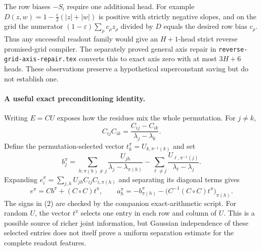 \documentclass[11pt]{article}
\begin{document}
The row biases $-S_i$ require one additional head. For example
$D(z,w)=1-\frac\varepsilon2(|z|+|w|)$ is positive with strictly
negative slopes, and on the grid the numerator
$(1-\varepsilon)\sum_\rho c_\rho z_\rho$ divided by $D$
equals the desired row bias $c_\rho$.
Thus any successful readout family would give an $H+1$-head
strict reverse promised-grid compiler. The separately proved general
axis repair in \texttt{reverse-grid-axis-repair.tex} converts this
to exact axis zero with at most $3H+6$ heads. These observations
preserve a hypothetical superconstant saving but do not establish one.

\paragraph{A useful exact preconditioning identity.}
Writing $E=CU$ exposes how the residues mix the whole permutation.
For $j\neq k$,
\[
 C_{ij}C_{ik}=\frac{C_{ij}-C_{ik}}{\lambda_j-\lambda_k}.
\]
Define the permutation-selected vector
$t_k^\pi=U_{k,\pi^{-1}(k)}$ and set
\[
 b_j^\pi=\sum_{h:\pi(h)\neq j}
                \frac{U_{jh}}{\lambda_j-\lambda_{\pi(h)}}
       -\sum_{\ell\neq j}
                \frac{U_{\ell,\pi^{-1}(j)}}{\lambda_\ell-\lambda_j}.
\]
Expanding $e_i^\pi=\sum_{j,h}U_{jh}C_{ij}C_{i,\pi(h)}$
and separating its diagonal terms gives
\[
 e^\pi=Cb^\pi+(C\circ C)t^\pi,
 \qquad
 a_h^\pi=-b_{\pi(h)}^\pi-
           \bigl(C^{-1}(C\circ C)t^\pi\bigr)_{\pi(h)}.
 \tag{2}
\]
The signs in (2) are checked by the companion exact-arithmetic script.
For random $U$, the vector $t^\pi$ selects one entry in each row and
column of $U$. This is a possible source of richer joint information,
but Gaussian independence of these selected entries does not itself
prove a uniform separation estimate for the complete readout features.
\end{document}
